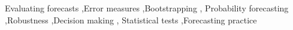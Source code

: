 \begin{frontmatter}
\begin{keyword}
Evaluating forecasts \sep Error measures \sep Bootstrapping \sep
Probability forecasting \sep Robustness \sep Decision making \sep
Statistical tests \sep Forecasting practice
\end{keyword}

\end{frontmatter}
